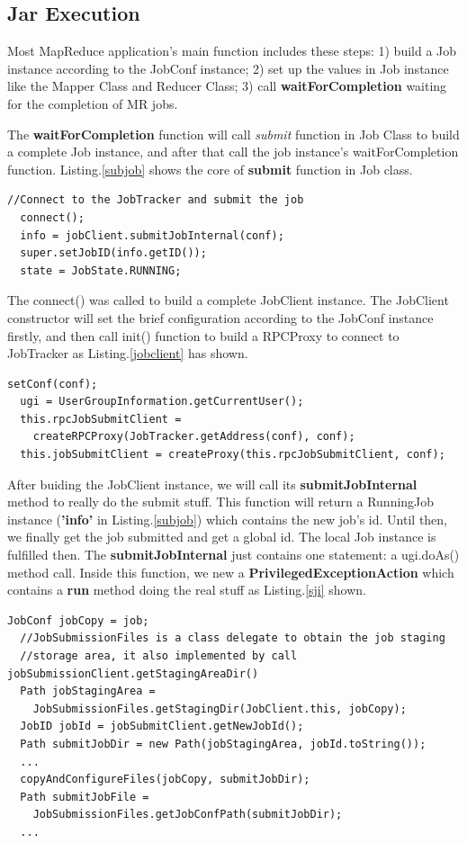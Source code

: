 \documentclass{tufte-book}
\begin{document}
\subsection{Jar Execution}
Most MapReduce application's main function includes these steps: 1)
build a Job instance according to the JobConf instance; 2) set up the
values in Job instance like the Mapper Class and Reducer Class; 3)
call \textbf{waitForCompletion} waiting for the completion of 
MR jobs.

The \textbf{waitForCompletion} function will call \textit{submit}
function in Job Class to build a complete Job instance, and after that
call the job instance's waitForCompletion function. Listing.\ref{subjob} shows
the core of \textbf{submit} function in Job class.

\begin{lstlisting}[caption=submit function in Job class, label=subjob]
  //Connect to the JobTracker and submit the job
  connect();
  info = jobClient.submitJobInternal(conf);
  super.setJobID(info.getID());
  state = JobState.RUNNING;
\end{lstlisting}

The connect() was called to build a complete JobClient instance. The
JobClient constructor will set the brief configuration according to
the JobConf instance firstly, and then call init() function to build a
RPCProxy to connect to JobTracker as Listing.\ref{jobclient} has shown.

\begin{lstlisting}[caption=JobClient init, label=jobclient]
  setConf(conf);
  ugi = UserGroupInformation.getCurrentUser();
  this.rpcJobSubmitClient =
    createRPCProxy(JobTracker.getAddress(conf), conf);
  this.jobSubmitClient = createProxy(this.rpcJobSubmitClient, conf);
\end{lstlisting}

After buiding the JobClient instance, we will call its
\textbf{submitJobInternal} method to really do the submit stuff. This
function will return a RunningJob instance (\textbf{'info'} in
Listing.\ref{subjob}) which contains the new job's id. Until then, we
finally get the job submitted and get a global id. The local Job
instance is fulfilled then. The \textbf{submitJobInternal} just
contains one statement: a ugi.doAs() method call. Inside this
function, we new a \textbf{PrivilegedExceptionAction} which contains a
\textbf{run} method doing the real stuff as Listing.\ref{sji} shown.

\begin{lstlisting}[caption=submitJobInternal, label=sji]
  JobConf jobCopy = job;
  //JobSubmissionFiles is a class delegate to obtain the job staging
  //storage area, it also implemented by call jobSubmissionClient.getStagingAreaDir()
  Path jobStagingArea =
    JobSubmissionFiles.getStagingDir(JobClient.this, jobCopy);
  JobID jobId = jobSubmitClient.getNewJobId();
  Path submitJobDir = new Path(jobStagingArea, jobId.toString());
  ...
  copyAndConfigureFiles(jobCopy, submitJobDir);
  Path submitJobFile =
    JobSubmissionFiles.getJobConfPath(submitJobDir);
  ...
\end{lstlisting}
\end{document}
